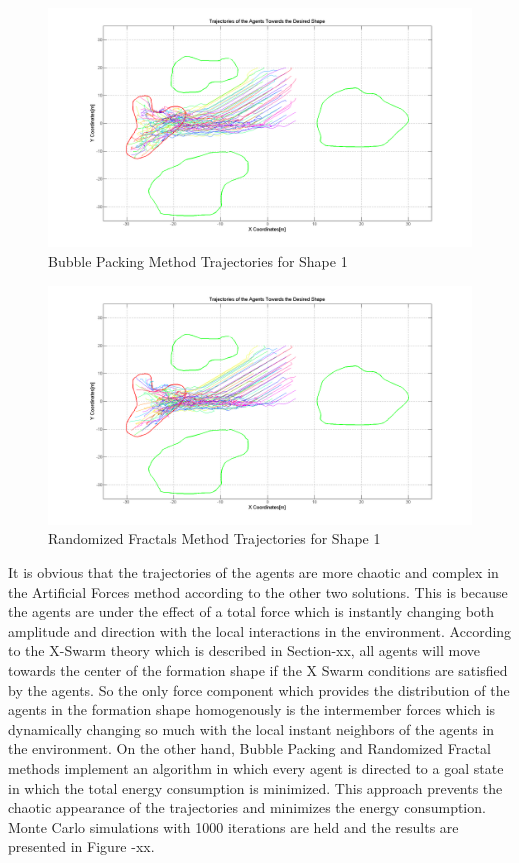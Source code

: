 \documentclass[twoside]{article}
\begin{document}
		\begin{figure}[H]
			\caption{Bubble Packing Method Trajectories for Shape 1}
			\centerline{\includegraphics[scale = 0.35]{Bubble_Trajectories_1}}
		\end{figure} 	
		
			\begin{figure}[H]
				\caption{Randomized Fractals Method Trajectories for Shape 1}
				\centerline{\includegraphics[scale = 0.35]{Randomized_Trajectories_1}}
			\end{figure} 	
			
		It is obvious that the trajectories of the agents are more chaotic and complex in the Artificial Forces method according to the other two solutions. This is because the agents are under the effect of a total force which is instantly changing both amplitude and direction with the local interactions in the environment. According to the X-Swarm theory which is described in Section-xx, all agents will move towards the center of the formation shape if the X Swarm conditions are satisfied by the agents. So the only force component which provides the distribution of the agents in the formation shape homogenously is the intermember forces which is dynamically changing so much with the local instant neighbors of the agents in the environment. On the other hand, Bubble Packing and Randomized Fractal methods implement an algorithm in which every agent is directed to a goal state in which the total energy consumption is minimized. This approach prevents the chaotic appearance of the trajectories and minimizes the energy consumption.
		Monte Carlo simulations with 1000 iterations are held and the results are presented in Figure -xx. 
		
\end{document}
